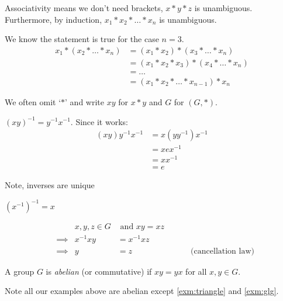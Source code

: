 \begin{remark}
Associativity means we don't need brackets, $x * y * z$ is unambiguous.
Furthermore, by induction, $x_1 * x_2 * \ldots * x_n$ is unambiguous.

We know the statement is true for the case $n = 3$.
\begin{align*}
    x_1 * (x_2 * \ldots * x_n) &= (x_1 * x_2) * (x_3 * \ldots * x_n) \\
    &= (x_1 * x_2 * x_3) * (x_4 * \ldots * x_n) \\
    &= \ldots \\
    &= (x_1 * x_2 * \ldots * x_{n-1}) * x_n
\end{align*}
\end{remark}

\begin{remark}
We often omit `$*$' and write $x y$ for $x * y$ and $G$ for $(G, *)$.
\end{remark}

\begin{remark}
$(xy)^{-1} = y^{-1} x^{-1}$. Since it works:
\begin{align*}
    (xy)y^{-1}x^{-1} &= x(y y^{-1})x^{-1} \\
    &= x e x^{-1} \\
    &= x x^{-1} \\
    &= e
\end{align*}
\end{remark}
Note, inverses are unique

\begin{remark}
$(x^{-1})^{-1} = x$
\end{remark}

\begin{remark} \label{rem:cancellation-law}
\begin{align*} 
    && x, y, z \in G &\text{ and } xy = xz \\
    &\implies & x^{-1} x y &= x^{-1} x z \\
    &\implies & y &= z \hspace{3cm} \text{(cancellation law)}
\end{align*}
\end{remark}


\begin{definition}
A group $G$ is \emph{abelian} (or commutative) if $xy = yx$ for all $x, y \in G$.
\end{definition}

Note all our examples above are abelian except \ref{exm:triangle} and \ref{exm:glg}.


